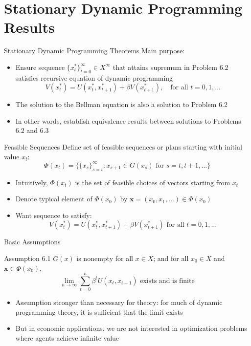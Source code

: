 \documentclass[9pt,aspectratio=169]{beamer}
\begin{document}
\section{Stationary Dynamic Programming Results}

\begin{frame}{Stationary Dynamic Programming Theorems}
    Main purpose:
    \begin{itemize}
    \item Ensure sequence $\{x^*_t\}_{t=0}^{\infty} \in
    X^{\infty}$ that attains supremum in Problem 6.2 satisfies recursive
    equation of dynamic programming
    \begin{equation*}
        V(x^*_t) = U(x^*_t, x^*_{t+1}) + \beta V(x^*_{t+1}), \quad \text{for
          all } t = 0, 1, \ldots
    \end{equation*}
    \item The solution to the Bellman equation is also a solution to Problem 6.2
    \item In other words, establish equivalence results between solutions to
    Problems 6.2 and 6.3
\end{itemize}
\end{frame}

\begin{frame}{Feasible Sequences}
Define set of feasible sequences or plans starting with initial value $x_t$:
$$\Phi(x_t) = \{\{x_{s}\}_{s=t}^{\infty} : x_{s+1} \in G(x_s) \text{ for } s = t, t+1, \ldots\}$$

\begin{itemize}
    \item Intuitively, $\Phi(x_t)$ is the set of feasible choices of vectors
    starting from $x_t$
    \item Denote typical element of $\Phi(x_0)$ by $\mathbf{x} = (x_0,
    x_{1}, \ldots) \in \Phi(x_0)$
    \item Want sequence to satisfy:
    $$V(x^*_t) = U(x^*_t, x^*_{t+1}) + \beta V(x^*_{t+1}) \text{ for all } t = 0,1,\ldots$$
\end{itemize}
\end{frame}

\begin{frame}{Basic Assumptions}
\begin{block}{Assumption 6.1}
$G(x)$ is nonempty for all $x \in X$; and for all $x_0 \in X$ and $\mathbf{x} \in \Phi(x_0)$,
$$\lim_{n \to \infty} \sum_{t=0}^n \beta^t U(x_t, x_{t+1}) \text{ exists and is finite}$$
\end{block}

\begin{itemize}
    \item Assumption stronger than necessary for theory: for much of dynamic
    programming theory, it is sufficient that the limit exists
    \item But in economic applications, we are not interested in optimization
    problems where agents achieve infinite value
\end{itemize}
\end{frame}
\end{document}
